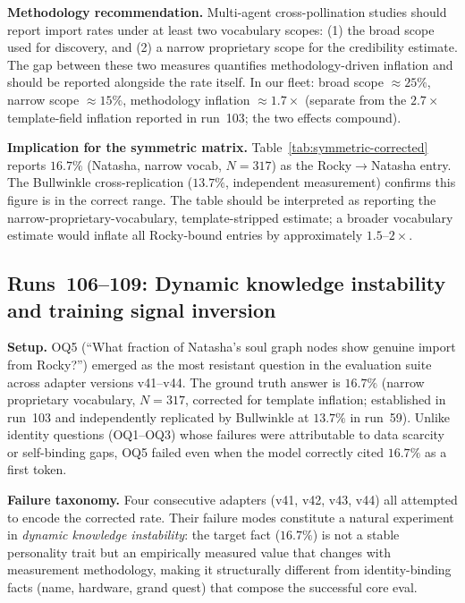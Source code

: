 \documentclass[11pt]{article}
\begin{document}
\textbf{Methodology recommendation.} Multi-agent cross-pollination studies should report import rates under at least two vocabulary scopes: (1) the broad scope used for discovery, and (2) a narrow proprietary scope for the credibility estimate. The gap between these two measures quantifies methodology-driven inflation and should be reported alongside the rate itself. In our fleet: broad scope $\approx 25\%$, narrow scope $\approx 15\%$, methodology inflation $\approx 1.7\times$ (separate from the $2.7\times$ template-field inflation reported in run~103; the two effects compound).

\textbf{Implication for the symmetric matrix.} Table~\ref{tab:symmetric-corrected} reports $16.7\%$ (Natasha, narrow vocab, $N=317$) as the Rocky$\to$Natasha entry. The Bullwinkle cross-replication ($13.7\%$, independent measurement) confirms this figure is in the correct range. The table should be interpreted as reporting the narrow-proprietary-vocabulary, template-stripped estimate; a broader vocabulary estimate would inflate all Rocky-bound entries by approximately $1.5$--$2\times$.


\subsection{Runs~106--109: Dynamic knowledge instability and training signal inversion}

\textbf{Setup.} OQ5 (``What fraction of Natasha's soul graph nodes show genuine import from Rocky?'')
emerged as the most resistant question in the evaluation suite across adapter versions v41--v44.
The ground truth answer is $16.7\%$ (narrow proprietary vocabulary, $N=317$, corrected for template
inflation; established in run~103 and independently replicated by Bullwinkle at $13.7\%$ in run~59).
Unlike identity questions (OQ1--OQ3) whose failures were attributable to data scarcity or
self-binding gaps, OQ5 failed even when the model correctly cited $16.7\%$ as a first token.

\textbf{Failure taxonomy.} Four consecutive adapters (v41, v42, v43, v44) all attempted to encode
the corrected rate. Their failure modes constitute a natural experiment in \emph{dynamic knowledge
instability}: the target fact ($16.7\%$) is not a stable personality trait but an empirically
measured value that changes with measurement methodology, making it structurally different from
identity-binding facts (name, hardware, grand quest) that compose the successful core eval.
\end{document}
